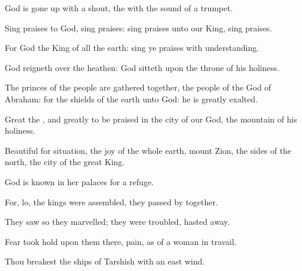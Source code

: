 {\Q {}God is gone
up with a
shout, the
{} with the
sound of a
trumpet.


\par }{\Q {}Sing
praises to
God, sing
praises: sing
praises unto our
King, sing
praises.


\par }{\Q {}For
God
{} the
King of all the
earth: sing ye
praises with
understanding.


\par }{\Q {}God
reigneth over the
heathen:
God
sitteth upon the
throne of his
holiness.


\par }{\Q {}The
princes of the
people are gathered
together,
{} the
people of the
God of
Abraham: for the
shields of the
earth
{} unto
God: he is
greatly
exalted.




\par }
{\Q {}Great
{} the
{}, and
greatly to be
praised in the
city of our
God,
{} the
mountain of his
holiness.


\par }{\Q {}Beautiful for
situation, the
joy of the whole
earth,
{}
mount
Zion,
{} the
sides of the
north, the
city of the
great
King.


\par }{\Q {}God is
known in her
palaces for a
refuge.


\par }{\Q {}For, lo, the
kings were
assembled, they passed
by
together.


\par }{\Q {}They
saw
{} so they
marvelled; they were
troubled,
{} hasted
away.


\par }{\Q {}Fear took
hold upon them there,
{}
pain, as of a woman in
travail.


\par }{\Q {}Thou
breakest the
ships of
Tarshish with an
east
wind.


\par }{\BB \par }
